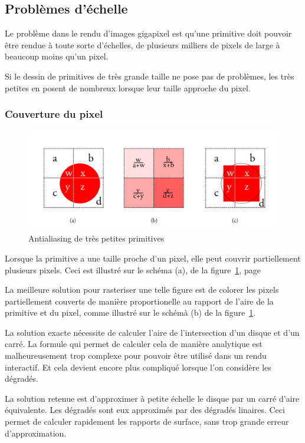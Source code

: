 	\subsection{Problèmes d'échelle}
		Le problème dans le rendu d'images gigapixel est qu'une primitive doit pouvoir être
		rendue à toute sorte d'échelles, de plusieurs milliers de pixels de large à beaucoup
		moins qu'un pixel. 

		Si le dessin de primitives de très grande taille ne pose pas de problèmes, les très
		petites en posent de nombreux lorsque leur taille approche du pixel.

		\subsubsection{Couverture du pixel}
			\begin{figure}[ht]
				\centering
				\includegraphics[width=\textwidth]{images/couverture-pixels} 
				\caption{Antialiasing de très petites primitives}
				\label{fig:couverture}
			\end{figure}
			Lorsque la primitive a une taille proche d'un pixel, elle peut couvrir partiellement
			plusieurs pixels. Ceci est illustré sur le schéma (a), de la figure~\ref{fig:couverture},
			page~\pageref{fig:couverture}

			La meilleure solution pour rasteriser une telle figure est de colorer les pixels partiellement
			couverts de manière proportionelle au rapport de l'aire de la primitive et du pixel, comme 
			illustré sur le schémà (b) de la figure~\ref{fig:couverture}.
			
			La solution exacte nécessite de calculer l'aire de l'intersection d'un disque et d'un carré. 
			La formule qui permet de calculer cela de manière analytique est malheureusement trop complexe pour
			pouvoir être utilisé dans un rendu interactif. Et cela devient encore plus compliqué lorsque 
			l'on considère les dégradés.

			La solution retenue est d'approximer à petite échelle le disque par un carré d'aire équivalente.
			Les dégradés sont eux approximés par des dégradés linaires. Ceci permet de calculer rapidement les
			rapports de surface, sans trop grande erreur d'approximation.

